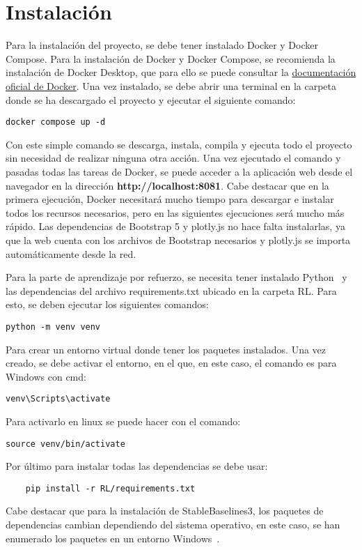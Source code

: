 \section{Instalación}
\label{sec:instalacion}
Para la instalación del proyecto, se debe tener instalado Docker y Docker Compose. Para la instalación de Docker y Docker Compose, se recomienda la instalación de Docker Desktop, que para ello se puede consultar la \href{https://docs.docker.com/get-docker/}{documentación oficial de Docker}. Una vez instalado, se debe abrir una terminal en la carpeta donde se ha descargado el proyecto y ejecutar el siguiente comando:
\begin{verbatim}
docker compose up -d
\end{verbatim}
Con este simple comando se descarga, instala, compila y ejecuta todo el proyecto sin necesidad de realizar ninguna otra acción.
Una vez ejecutado el comando y pasadas todas las tareas de Docker, se puede acceder a la aplicación web desde el navegador en la dirección \textbf{http://localhost:8081}. Cabe destacar que en la primera ejecución, Docker necesitará mucho tiempo para descargar e instalar todos los recursos necesarios, pero en las siguientes ejecuciones será mucho más rápido.
Las dependencias de Bootstrap 5 y plotly.js no hace falta instalarlas, ya que la web cuenta con los archivos de Bootstrap necesarios y plotly.js se importa automáticamente desde la red.



Para la parte de aprendizaje por refuerzo, se necesita tener instalado Python~\cite{python} y las dependencias del archivo requirements.txt ubicado en la carpeta RL. Para esto, se deben ejecutar los siguientes comandos:
\begin{verbatim}
python -m venv venv
\end{verbatim}
Para crear un entorno virtual donde tener los paquetes instalados. Una vez creado, se debe activar el entorno, en el que, en este caso, el comando es para Windows con cmd:
\begin{verbatim}
venv\Scripts\activate
\end{verbatim}
Para activarlo en linux se puede hacer con el comando:
\begin{verbatim}
source venv/bin/activate
\end{verbatim}
Por último para instalar todas las dependencias se debe usar:
\begin{verbatim}
    pip install -r RL/requirements.txt
\end{verbatim}
Cabe destacar que para la instalación de StableBaselines3, los paquetes de dependencias cambian dependiendo del sistema operativo, en este caso, se han enumerado los paquetes en un entorno Windows~\cite{stable}.


